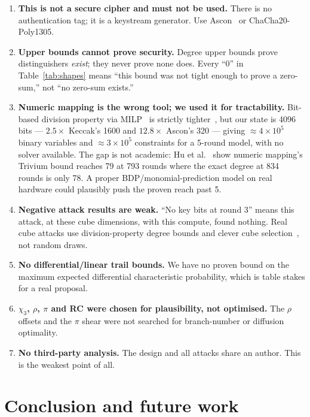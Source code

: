 \documentclass[11pt,a4paper]{article}
\theoremstyle{plain}
\theoremstyle{definition}
\theoremstyle{remark}
\begin{document}
\begin{enumerate}
  \item \textbf{This is not a secure cipher and must not be used.} There is no
    authentication tag; it is a keystream generator. Use Ascon~\cite{sp800232} or
    ChaCha20-Poly1305.
  \item \textbf{Upper bounds cannot prove security.} Degree upper bounds prove
    distinguishers \emph{exist}; they never prove none does. Every ``0'' in
    Table~\ref{tab:shapes} means ``this bound was not tight enough to prove a
    zero-sum,'' not ``no zero-sum exists.''
  \item \textbf{Numeric mapping is the wrong tool; we used it for tractability.}
    Bit-based division property via MILP~\cite{todo16,xiang16} is strictly
    tighter~\cite{zhang21}, but our state is 4096 bits --- $2.5\times$ Keccak's 1600
    and $12.8\times$ Ascon's 320 --- giving $\approx 4\times10^5$ binary variables and
    $\approx 3\times10^5$ constraints for a 5-round model, with no solver available.
    The gap is not academic: Hu et al.~\cite{hu20} show numeric mapping's Trivium bound
    reaches 79 at 793 rounds where the exact degree at 834 rounds is only 78. A proper
    BDP/monomial-prediction model on real hardware could plausibly push the proven
    reach past 5.
  \item \textbf{Negative attack results are weak.} ``No key bits at round 3'' means
    this attack, at these cube dimensions, with this compute, found nothing. Real cube
    attacks use division-property degree bounds and clever cube
    selection~\cite{todo17cube}, not random draws.
  \item \textbf{No differential/linear trail bounds.} We have no proven bound on the
    maximum expected differential characteristic probability, which is table stakes for
    a real proposal.
  \item \textbf{$\chi_3$, $\rho$, $\pi$ and RC were chosen for plausibility, not
    optimised.} The $\rho$ offsets and the $\pi$ shear were not searched for
    branch-number or diffusion optimality.
  \item \textbf{No third-party analysis.} The design and all attacks share an author.
    This is the weakest point of all.
\end{enumerate}

\section{Conclusion and future work}
\end{document}
